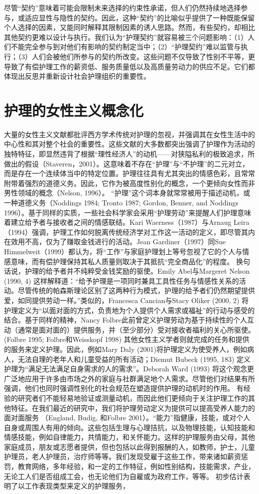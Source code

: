 \documentclass[UTF8]{ctexart}
\begin{document}
尽管“契约”意味着可能会限制未来选择的约束性承诺，但人们仍然持续地选择参与，或适应显性与隐性的契约。因此，这种“契约”的比喻似乎提供了一种既能保留个人选择的因素，又能同时解释其限制因素的诱人思路。然而，有些契约，却相比其他契约更难以设计与执行。我们认为“护理契约”就容易被三个问题影响：（1）人们不能完全参与到对他们有影响的契约制定当中；（2）“护理契约”难以监管与执行；（3）人们会被他们所参与的契约所改变。这些问题不仅导致了性别不平等，更导致了有偿护理工作的薪资低、服务质量低以及高质量劳动力的供应不足。它们都体现出反思并重新设计社会护理组织的重要性。

\section{护理的女性主义概念化}
大量的女性主义文献都批评西方学术传统对护理的忽视，并强调其在女性生活中的中心性和其对整个社会的重要性。这些文献的大多数都突出强调了护理作为活动的独特特征，即显然违背了根据“理性经济人”的动机——对狭隘私利的极致追求，所做出的假设（Staveren，2001）。这意味着不存在“护理”与“不护理”的二元对立，而是存在一个连续体当中的特定位置。护理往往具有尤其突出的情感色彩，且常常附带着强烈的道德义务。因此，它作为被高度性别化的概念，一个更倾向女性而非男性领域的概念（Nelson, 1996）。
“护理”这个词本身就常常被用于描述动机，或一种道德义务（Noddings 1984; Tronto 1987; Gordon, Benner, and Noddings 1996）。基于同样的实质，一些社会科学家会采用“护理劳动”来提醒人们护理意味着建立给予者与接收者之间的情感联结。Kari Waerness（1987）与Arnaug Leira（1994）强调，护理工作如何脱离传统经济学对工作这一活动的定义，即尽管其内在效用不高，仅为了赚取金钱进行的活动。Jean Gardiner（1997）同Sue Himmelweit（1999）都认为，将“工作”与家庭护理划上等号忽视了它的个人与情感意味，而有偿护理保持其私人质量则取决于其抵抗“完全商品化”的程度。
换句话说，护理的给予者并不纯粹受金钱奖励的驱使。Emily Abel与Margeret Nelson (1990, 4) 这样解释道：“给予护理是一项同时兼具工具性任务与情感性关系的活动。尽管传统的帕森斯理论区别了这两种行为模式，护理的给予者们仍然期望提供爱，如同提供劳动一样。”类似的，Francesca Cancian与Stacy Oliker (2000, 2) 将护理定义为“以面对面的方式，负责地为个人提供个人需求或福祉”的行动与感受的结合。基于同样的精神，Nancy Folbre此前曾定义护理劳动为基于持续性的个人互动（通常是面对面的）提供服务，并（至少部分）受对接收者福利的关心所驱使。(Folbre 1995; Folbre和Weisskopf 1998)
其他女性主义学者则就完成的任务和提供的服务来定义护理。因此，例如Mary Daly (2001)将护理定义为使受养人，例如病人，无法自理的老年人和儿童受益的所有活动；Diemut Bubeck (1995, 183) 定义护理为“满足无法满足自身需求的人的需求”。Deborah Ward (1993) 将这个观念更广泛地应用于许多由市场之外的家庭与社群满足地个人需求。尽管他们对结果有所强调，他们也同时强调性别化的社会规范在塑造提供护理的动机时的作用。
有经验的研究者们不能轻易地验证或测量动机，而因此他们更倾向于关注护理工作的其他特征。在我们最近的研究中，我们将护理劳动定义为提供可以提高受养人能力的面对面服务 （England, Budig, 和Folbre 2001）。“能力”指健康，技能，或对个人自身或周围人有用的倾向。这些包括生理与心理拮抗，以及物理技能，认知技能和情感技能，例如自律能力，共情能力，和关怀能力。这样的护理服务由父母，其他家庭成员，朋友或志愿者提供，但也包括以此得到报酬的人，如教师，护士，儿童护理员，老人护理员，治疗师等等。我们发现受雇于这些工作，带来诸如薪资惩罚，教育网络，多年经验，和一定的工作特征，例如性别结构，技能需求，产业，无论工人们是否组成工会，也无论他们为自雇或为政府工作，等等。
初步估计表明了以工作表现类型来定义的护理服务，
\end{document}
